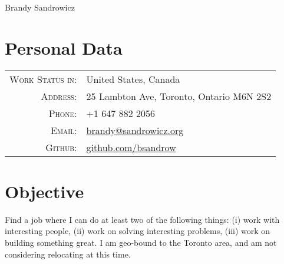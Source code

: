 \documentclass[a4paper,10pt]{article}
\begin{document}
    \pagestyle{empty} %

    
    \par{\centering
        {\Huge Brandy Sandrowicz}
        \bigskip\par}
    

    
        \section{Personal Data}
        \begin{tabular}{ r l }
        \textsc{Work Status in:}                & United States, Canada\\
        \textsc{Address:}                       & 25 Lambton Ave, Toronto, Ontario M6N 2S2\\
        \textsc{Phone:}                         & +1 647 882 2056\\
        \textsc{Email:}                         & \href{mailto:brandy@sandrowicz.org}{brandy@sandrowicz.org}\\
        \textsc{Github:}                        & \href{https://github.com/bsandrow}{github.com/bsandrow}\\
        \end{tabular}
    

    
        \section{Objective}
        Find a job where I can do at least two of the following things: (i) work with interesting people, (ii) work on solving interesting problems, (iii) work on building something great. I am geo-bound to the Toronto area, and am not considering relocating at this time.


    
\end{document}
